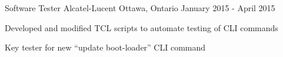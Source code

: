 

\begin{cventries}
  \cventry
    {Software Tester} %
    {Alcatel-Lucent} %
    {Ottawa, Ontario} %
    {January 2015 - April 2015} %
    {
      \begin{cvitems} %
        \item {Developed and modified TCL scripts to automate testing of CLI commands}
        \item {Key tester for new “update boot-loader” CLI command}
      \end{cvitems}
    }

\end{cventries}
